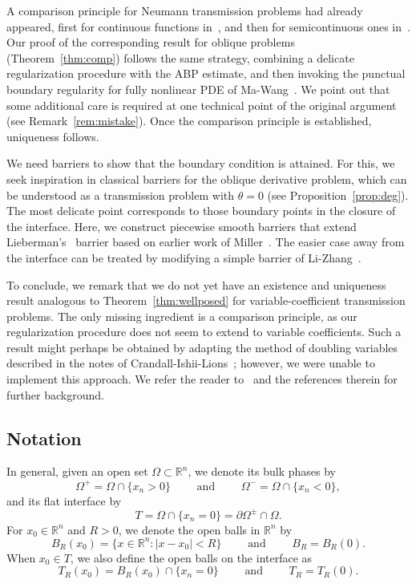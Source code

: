 \documentclass[letter,11pt]{amsart}
\newcommand{\R}{\mathbb{R}}
\theoremstyle{definition}
\numberwithin{equation}{section}
\begin{document}
\medskip

A comparison principle for Neumann transmission problems had already appeared, first for continuous functions in~\cite{DFSfb,DFS}, and then for semicontinuous ones in~\cite{SS}.
Our proof of the corresponding result for oblique problems (Theorem~\ref{thm:comp}) follows the same strategy,
combining a delicate regularization procedure with the ABP estimate, and then invoking the punctual boundary regularity for fully nonlinear PDE of Ma-Wang~\cite{MW}.
We point out that some additional care is required at one technical point of the original argument (see Remark~\ref{rem:mistake}).
Once the comparison principle is established, uniqueness follows.

\medskip

We need barriers to show that the boundary condition is attained.
For this, we seek inspiration in classical barriers for the oblique derivative problem, which can be understood as a transmission problem with $\theta = 0$ (see Proposition~\ref{prop:deg}).
The most delicate point corresponds to those boundary points in the closure of the interface.
Here, we construct piecewise smooth barriers that extend Lieberman's~\cite{L} barrier based on earlier work of Miller~\cite{Miller}.
The easier case away from the interface can be treated by modifying a simple barrier of Li-Zhang~\cite{LZ}.

\medskip

To conclude, we remark that we do not yet have an existence and uniqueness result analogous to Theorem~\ref{thm:wellposed} for variable-coefficient transmission problems.
The only missing ingredient is a comparison principle, as our regularization procedure does not seem to extend to variable coefficients.
Such a result might perhaps be obtained by adapting the method of doubling variables described in the notes of Crandall-Ishii-Lions~\cite{CIL}; however, we were unable to implement this approach.
We refer the reader to~\cite{CIL} and the references therein for further background.

\subsection{Notation}

In general, given an open set $\Omega \subset \R^n$, we denote its bulk phases by
\[
\Omega^{+} = \Omega \cap \{x_n > 0\}
\qquad \text{ and }
\qquad \Omega^{-} = \Omega \cap \{x_n < 0\},
\]
and its flat interface by
\[
T =
\Omega \cap \{x_n = 0\} = \partial \Omega^{\pm} \cap \Omega.
\]
For $x_0 \in \R^{n}$ and $R> 0$, we denote the open balls in $\R^{n}$ by
\[
B_{R}(x_0) = \{x \in \R^n \colon |x - x_0| < R\} \qquad \text{ and } \qquad B_R = B_{R}(0).
\]
When $x_0 \in T$, we also define the open balls on the interface as
\[
T_R(x_0) = B_R(x_0) \cap \{x_n = 0\}
\qquad
\text{ and }
\qquad T_R = T_R(0).
\]
\end{document}
